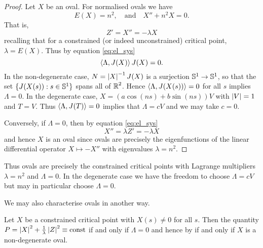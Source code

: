 \documentclass[12pt]{article}
\begin{document}
\begin{proof}
Let \(X\) be an oval. For normalised ovals we have
\[
E(X) = n^2, \quad \text{and} \quad X'' + n^2 X = 0.
\]
That is,
\[
Z' = X'' = - \lambda X
\]
recalling that for a constrained (or indeed unconstrained) critical point, \(\lambda = E(X)\). Thus by equation \eqref{eq:el_sys}
\[
\left\langle{\Lambda},{J(X)}\right\rangle J(X) = 0.
\]
In the non-degenerate case, \(N = \left|{X}\right|^{-1}J(X)\) is a surjection \(\operatorname{\mathbb{S}^1} \to \operatorname{\mathbb{S}^1}\), so that the set \(\{J(X(s)) : s \in \operatorname{\mathbb{S}^1}\}\) spans all of \(\operatorname{\mathbb{R}}^2\). Hence \(\left\langle{\Lambda},{J(X(s))}\right\rangle = 0\) for all \(s\) implies \(\Lambda = 0\). In the degenerate case, \(X = (a \cos (ns) + b \sin(ns)) V\) with \(\left|{V}\right| = 1\) and \(T = V\). Thus \(\left\langle{\Lambda},{J(T)}\right\rangle = 0\) implies that \(\Lambda = cV\) and we may take \(c = 0\).

Conversely, if \(\Lambda = 0\), then by equation \eqref{eq:el_sys}
\[
X'' = \lambda Z' = -\lambda X
\]
and hence \(X\) is an oval since ovals are precisely the eigenfunctions of the linear differential operator \(X \mapsto -X''\) with eigenvalues \(\lambda = n^2\).
\end{proof}

Thus ovals are precisely the constrained critical points with Lagrange multipliers \(\lambda = n^2\) and \(\Lambda = 0\). In the degenerate case we have the freedom to choose \(\Lambda = c V\) but may in particular choose \(\Lambda = 0\).

We may also characterise ovals in another way.

\begin{lem}
Let \(X\) be a constrained critical point with \(X(s) \ne 0\) for all \(s\). Then the quantity \(P = \left|{X}\right|^2 + \frac{1}{\lambda} \left|{Z}\right|^2 \equiv \text{const}\) if and only if \(\Lambda = 0\) and hence by  if and only if \(X\) is a non-degenerate oval.
\end{lem}
\end{document}

